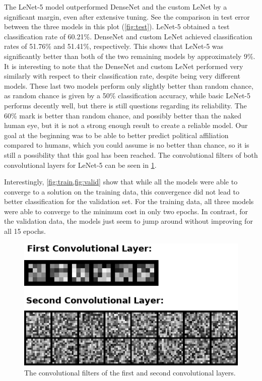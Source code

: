 \documentclass[manuscript,screen,review]{acmart}
\begin{document}
The LeNet-5 model outperformed DenseNet and the custom LeNet by a significant margin, even after extensive tuning. See the comparison in test error between the three models in this plot (\cref{fig:test}). LeNet-5 obtained a test classification rate of 60.21\%. DenseNet and custom LeNet achieved classification rates of 51.76\% and 51.41\%, respectively. This shows that LeNet-5 was significantly better than both of the two remaining models by approximately 9\%. It is interesting to note that the DenseNet and custom LeNet performed very similarly with respect to their classification rate, despite being very different models. These last two models perform only slightly better than random chance, as random chance is given by a 50\% classification accuracy, while basic LeNet-5 performs decently well, but there is still questions regarding its reliability. The 60\% mark is better than random chance, and possibly better than the naked human eye, but it is not a strong enough result to create a reliable model. Our goal at the beginning was to be able to better predict political affiliation compared to humans, which you could assume is no better than chance, so it is still a possibility that this goal has been reached. The convolutional filters of both convolutional layers for LeNet-5 can be seen in \cref{fig:filters}.
\par
Interestingly, \cref{fig:train,fig:valid} show that while all the models were able to converge to a solution on the training data, this convergence did not lead to better classification for the validation set. For the training data, all three models were able to converge to the minimum cost in only two epochs. In contrast, for the validation data, the models just seem to jump around without improving for all 15 epochs. 


\begin{figure}[h]
  \centering
  \includegraphics[width=\linewidth]{../presentation/filters.png}
  \caption{The convolutional filters of the first and second convolutional layers.}
  \label{fig:filters}
\end{figure}
\end{document}
